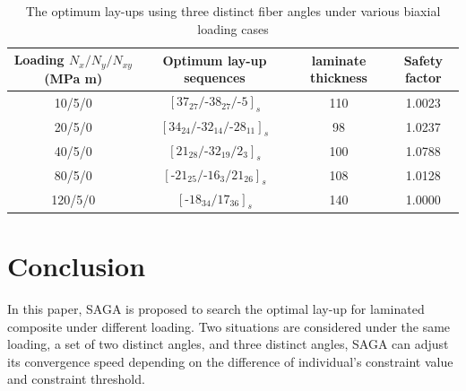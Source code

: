 \documentclass{article}
\begin{document}
\begin{table}
\caption{The optimum lay-ups using three distinct fiber angles under various biaxial loading cases}
\label{T300/5308 material properties}
\centering
\begin{tabular}{cccc}
	\toprule
	Loading	$N_{x}/N_{y}/N_{xy}$ (MPa m)	       & Optimum lay-up sequences                                   & laminate thickness &  Safety factor \\
	\midrule
	10/5/0                                         &  $[37_{27}/\text{-}38_{27}/\text{-}5]_s$                   &     110               &  1.0023 \\
	20/5/0                                         &  $[34_{24}/\text{-}32_{14}/\text{-}28_{11}]_s$             &     98               &  1.0237 \\
	40/5/0                                         &  $[21_{28}/\text{-}32_{19}/2_3]_s$                         &     100               &  1.0788 \\
	80/5/0                                         &  $[\text{-}21_{25}/\text{-}16_{3}/21_{26}]_s$              &     108               &  1.0128 \\
	120/5/0                                         &  $[\text{-}18_{34}/17_{36}]_s$                            &     140               &  1.0000 \\
	\bottomrule
\end{tabular}
\end{table}


\section{Conclusion}
In this paper, SAGA is proposed to search the optimal lay-up for laminated composite under different
loading. Two situations are considered under the same loading, a set of two distinct angles, and
three distinct angles, SAGA can adjust its convergence speed depending on the difference of
individual's constraint value and constraint threshold.  

\end{document}
